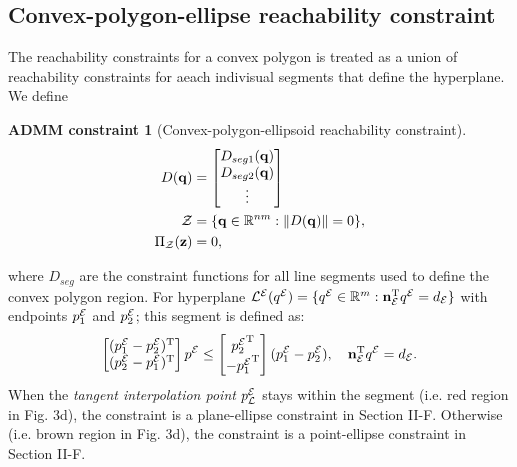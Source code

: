 \documentclass{article}
\newtheorem{constraint}{ADMM constraint}
\newcommand{\news}{\color{blue}}
\begin{document}
\subsection{Convex-polygon-ellipse reachability constraint}\label{sec:ellipse-region-constraint}
{\news  
The reachability constraints for a convex polygon is treated as a union of reachability constraints for aeach indivisual segments that define the hyperplane. We define
\setcounter{constraint}{3}
\setcounter{equation}{29}
\begin{constraint}[Convex-polygon-ellipsoid reachability constraint]\label{constraint:polygon-ellipsoid}
\begin{align}
D(\mathbf{q}) &= \begin{bmatrix}D_{seg1}(\mathbf{q})\\D_{seg2}(\mathbf{q})\\ \vdots\end{bmatrix} \label{eq:region_ellipsoid_constraint}\\
  \mathcal{Z} &= \{\mathbf{q}\in\mathbb{R}^{nm}:\lVert D(\mathbf{q})\rVert = 0 \},\\
   \Pi_{\mathcal{Z}}(\mathbf{z}) & = 0, 
\end{align}
\end{constraint}
where $D_{seg}$ are the constraint functions for all line segments used to define the convex polygon region. 
For hyperplane ${\mathcal{L}^{\mathcal{E}}}({q^{\mathcal{E}}}) = \{ {q^{\mathcal{E}}}\in\mathbb{R}^m:  \mathbf{n}_{\mathcal{E}}^\mathrm{T} {q^{\mathcal{E}}} = d_{\mathcal{E}}\}$ with endpoints ${p_1^{\mathcal{E}}}$ and ${p_2^{\mathcal{E}}}$; this segment is defined as:
\begin{equation}
\begin{bmatrix}({p_1^{\mathcal{E}}}- {p_2^{\mathcal{E}}})^\mathrm{T}\\( {p_2^{\mathcal{E}}} - {p_1^{\mathcal{E}}})^\mathrm{T}\end{bmatrix}  {p^{\mathcal{E}}} \leq \begin{bmatrix} {p_2^{\mathcal{E}}}^\mathrm{T}\\- {p_1^{\mathcal{E}}}^\mathrm{T}\end{bmatrix}( {p_1^{\mathcal{E}}}- {p_2^{\mathcal{E}}}), \quad \mathbf{n}_{\mathcal{E}}^\mathrm{T} {q^{\mathcal{E}}} = d_{\mathcal{E}}.
\end{equation}
When the \emph{tangent interpolation point} ${p_{\mathcal{L}}^{\mathcal{E}}}$ stays within the segment (i.e. red region in Fig. 3d), the constraint is a plane-ellipse constraint in Section II-F. Otherwise (i.e. brown region in Fig. 3d), the constraint is a point-ellipse constraint in Section II-F.

}
\end{document}

